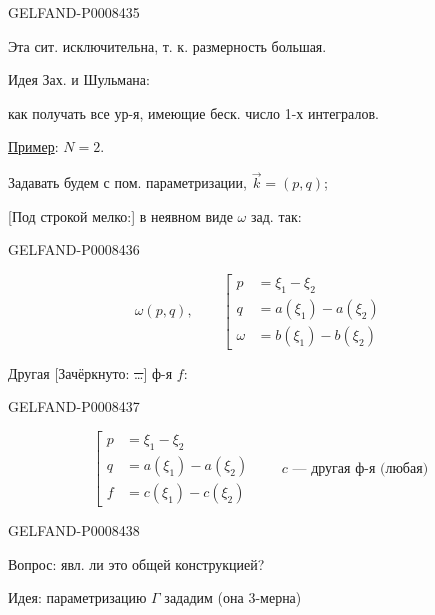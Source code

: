 \begin{GelfandAdjacentEvidence}{GELFAND-P000843}{5}

Эта сит. исключительна, т. к. размерность большая.

Идея Зах. и Шульмана:

как получать все ур-я, имеющие беск. число 1-х интегралов.

\uline{Пример}: \quad \uline{\(N=2\)}.

Задавать будем с пом. параметризации, \(\vec{k}=(p,q)\);

[Под строкой мелко:] в неявном виде \(\omega\) зад. так:
\end{GelfandAdjacentEvidence}
\begin{GelfandAdjacentEvidence}{GELFAND-P000843}{6}


\begin{equation*}
\omega(p,q),\qquad
\left[
\begin{aligned}
p&=\xi_1-\xi_2\\
q&=a(\xi_1)-a(\xi_2)\\
\omega&=b(\xi_1)-b(\xi_2)
\end{aligned}
\right.
\tag{2}
\end{equation*}

Другая [Зачёркнуто: \sout{…}] ф-я \(f\):
\end{GelfandAdjacentEvidence}
\begin{GelfandAdjacentEvidence}{GELFAND-P000843}{7}


\begin{equation*}
\left[
\begin{aligned}
p&=\xi_1-\xi_2\\
q&=a(\xi_1)-a(\xi_2)\\
f&=c(\xi_1)-c(\xi_2)
\end{aligned}
\right.
\qquad c\text{ — другая ф-я (любая)}
\tag{3}
\end{equation*}
\end{GelfandAdjacentEvidence}
\begin{GelfandAdjacentEvidence}{GELFAND-P000843}{8}


Вопрос: явл. ли это общей конструкцией?

Идея: параметризацию \(\Gamma\) зададим (она 3-мерна)
\end{GelfandAdjacentEvidence}
